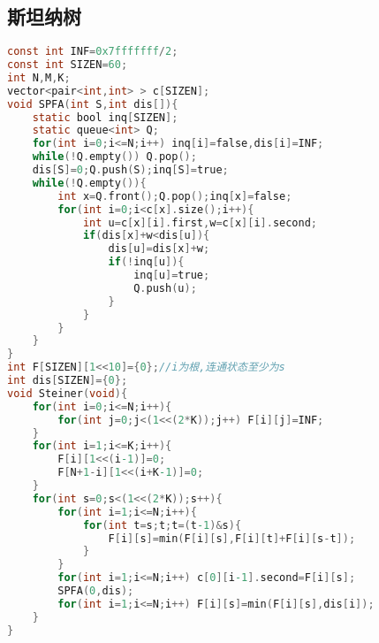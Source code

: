 \subsection{斯坦纳树}
\begin{lstlisting}[language=C]
const int INF=0x7fffffff/2;
const int SIZEN=60;
int N,M,K;
vector<pair<int,int> > c[SIZEN];
void SPFA(int S,int dis[]){
	static bool inq[SIZEN];
	static queue<int> Q;
	for(int i=0;i<=N;i++) inq[i]=false,dis[i]=INF;
	while(!Q.empty()) Q.pop();
	dis[S]=0;Q.push(S);inq[S]=true;
	while(!Q.empty()){
		int x=Q.front();Q.pop();inq[x]=false;
		for(int i=0;i<c[x].size();i++){
			int u=c[x][i].first,w=c[x][i].second;
			if(dis[x]+w<dis[u]){
				dis[u]=dis[x]+w;
				if(!inq[u]){
					inq[u]=true;
					Q.push(u);
				}
			}
		}
	}
}
int F[SIZEN][1<<10]={0};//i为根,连通状态至少为s
int dis[SIZEN]={0};
void Steiner(void){
	for(int i=0;i<=N;i++){
		for(int j=0;j<(1<<(2*K));j++) F[i][j]=INF;
	}
	for(int i=1;i<=K;i++){
		F[i][1<<(i-1)]=0;
		F[N+1-i][1<<(i+K-1)]=0;
	}
	for(int s=0;s<(1<<(2*K));s++){
		for(int i=1;i<=N;i++){
			for(int t=s;t;t=(t-1)&s){
				F[i][s]=min(F[i][s],F[i][t]+F[i][s-t]);
			}
		}
		for(int i=1;i<=N;i++) c[0][i-1].second=F[i][s];
		SPFA(0,dis);
		for(int i=1;i<=N;i++) F[i][s]=min(F[i][s],dis[i]);
	}
}
\end{lstlisting}
